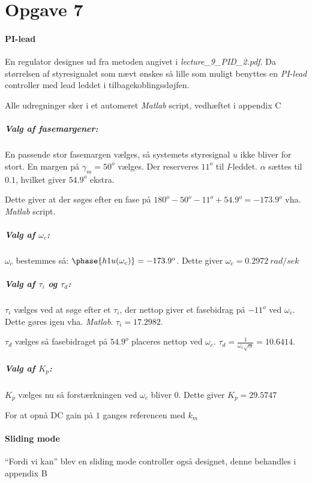 \section{Opgave 7}
\paragraph{ PI-lead }
En regulator designes ud fra metoden angivet i \emph{lecture\_9\_PID\_2.pdf}. Da
størrelsen af styresignalet som nævt ønskes så lille som muligt benyttes en
\emph{PI-lead} controller med lead leddet i tilbagekoblingssløjfen.

Alle udregninger sker i et automeret \emph{Matlab} script, vedhæftet i appendix
C

\subparagraph{Valg af fasemargener:}
	En passende stor fasemargen vælges, så systemets styresignal $u$ ikke bliver
	for stort. En margen på $\gamma_m = 50^o$ vælges.
	Der reserveres $11^o$ til \emph{I}-leddet.
	$\alpha$ sættes til $0.1$, hvilket giver $54.9^o$ ekstra.
	
	Dette giver at der søges efter en fase på $180^o - 50^o - 11^o + 54.9^o =
	-173.9^o$ vha. \emph{Matlab} script.
\subparagraph{Valg af $\omega_c$:}
	$\omega_c$ bestemmes så: $\phase{h1u(\omega_c)} = -173.9^o$. Dette giver
	$\omega_c =  0.2972~rad/sek$
\subparagraph{Valg af $\tau_i$ og $\tau_d$:}
	$\tau_i$ vælges ved at søge efter et $\tau_i$, der nettop giver et fasebidrag
	på $-11^o$ ved $\omega_c$. Dette gøres igen vha. \emph{Matlab}. $\tau_i =
	17.2982$.
	
	$\tau_d$ vælges så fasebidraget på $54.9^o$ placeres nettop ved $\omega_c$.
	$\tau_d = \frac{1}{\omega_c \sqrt{\alpha}} = 10.6414$.
\subparagraph{Valg af $K_p$:}
	$K_p$ vælges nu så forstærkningen ved $\omega_c$ bliver 0.
	Dette giver $K_p = 29.5747$
	
	For at opnå DC gain på $1$ ganges referencen med $k_m$
	
\paragraph{ Sliding mode }
	``Fordi vi kan'' blev en sliding mode controller også designet, denne
	behandles i appendix B
